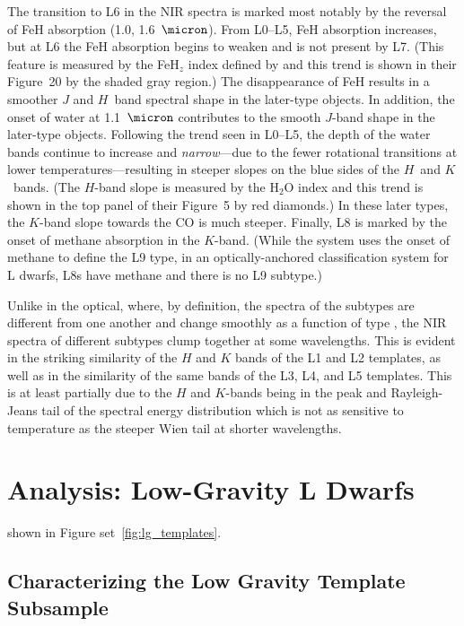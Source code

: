 \documentclass[12pt,preprint]{aastex}
\begin{document}
The transition to L6 in the NIR spectra is marked most notably by the reversal of FeH absorption (1.0, 1.6~$\micron$). From L0--L5, FeH absorption increases, but at L6 the FeH absorption begins to weaken and is not present by L7. (This feature is measured by the FeH$_z$ index defined by \citet{Allers:2013hk} and this trend is shown in their Figure~20 by the shaded gray region.) The disappearance of FeH results in a smoother $J$ and $H$~band spectral shape in the later-type objects. In addition, the onset of water at 1.1~$\micron$ contributes to the smooth $J$-band shape in the later-type objects. Following the trend seen in L0--L5, the depth of the water bands continue to increase and \emph{narrow}---due to the fewer rotational transitions at lower temperatures---resulting in steeper slopes on the blue sides of the $H$~and $K$~bands. (The $H$-band slope is measured by the \citet{Allers07} H$_2$O index and this trend is shown in the top panel of their Figure~5 by red diamonds.) In these later types, the $K$-band slope towards the CO is much steeper. Finally, L8 is marked by the onset of methane absorption in the $K$-band. (While the \citet{Geballe02} system uses the onset of methane to define the L9 type, in an optically-anchored classification system for L dwarfs, L8s have methane and there is no L9 subtype.) 

Unlike in the optical, where, by definition, the spectra of the subtypes are different from one another and change smoothly as a function of type \citep{Kirkpatrick05}, the NIR spectra of different subtypes clump together at some wavelengths.
This is evident in the striking similarity of the $H$ and $K$ bands of the L1 and L2 templates, as well as in the similarity of the same bands of the L3, L4, and L5 templates.
This is at least partially due to the $H$ and $K$-bands being in the peak and Rayleigh-Jeans tail of the spectral energy distribution which is not as sensitive to temperature as the steeper Wien tail at shorter wavelengths.

\section{Analysis: Low-Gravity L Dwarfs}
\label{sec:lowg}

shown in Figure set~\ref{fig:lg_templates}.



\subsection{Characterizing the Low Gravity Template Subsample}
\label{sec:templates_lowg}
\end{document}
